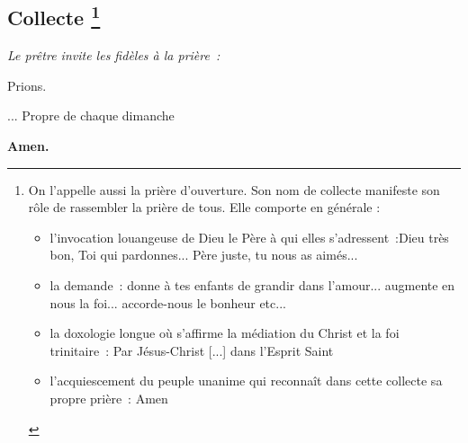 \subsection*{Collecte
  \footnote{On l'appelle aussi la prière d’ouverture. 
    Son nom de collecte manifeste son rôle de rassembler la prière de tous. 
    Elle comporte en générale : 
    \begin{itemize}
      \item l'invocation louangeuse de Dieu le Père à qui elles s'adressent~:Dieu très bon, Toi qui pardonnes... Père juste, tu nous as aimés... 
      \item la demande~:  donne à tes enfants de grandir dans l’amour... augmente en nous la foi... accorde-nous le bonheur etc... 
      \item la doxologie longue où s’affirme la médiation du Christ et la foi trinitaire~: Par Jésus-Christ [...] dans l’Esprit Saint 
      \item l’acquiescement du peuple unanime qui reconnaît dans cette collecte sa propre prière~: Amen 
    \end{itemize}
  }}

\emph{Le prêtre invite les fidèles à la prière~:}

Prions.

... Propre de chaque dimanche

{\bf Amen.}


